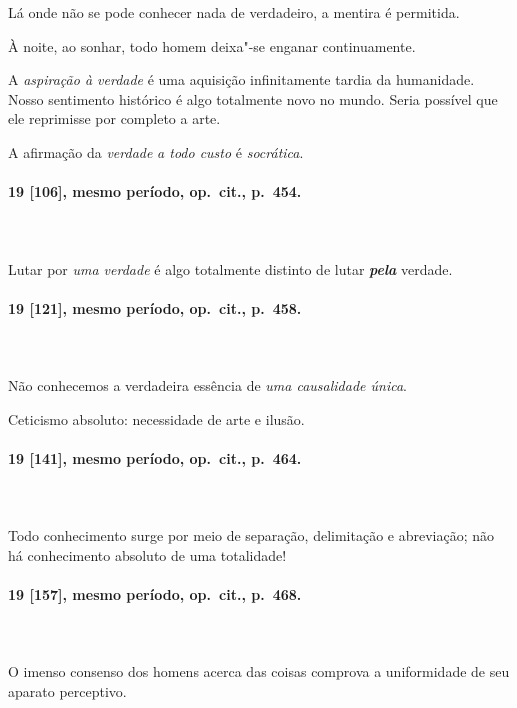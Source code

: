 Lá onde não se pode conhecer nada de verdadeiro, a mentira é permitida.

À noite, ao sonhar, todo homem deixa"-se enganar continuamente.

A \textit{aspiração à verdade} é uma aquisição infinitamente tardia da
humanidade. Nosso sentimento histórico é algo totalmente novo no mundo.
Seria possível que ele reprimisse por completo a arte. 

A afirmação da \textit{verdade} \textit{a todo custo} é
\textit{socrática}.

\pagebreak
\paragraph*{19 [106], mesmo período, op.~cit., p.~454.}
\ \\
\ \\

Lutar por \textit{uma verdade} é algo totalmente distinto de lutar
\textbf{\textit{pela}} verdade.

\pagebreak
\paragraph*{19 [121], mesmo período, op.~cit., p.~458.}
\ \\
\ \\

Não conhecemos a verdadeira essência de \textit{uma causalidade única}.

Ceticismo absoluto: necessidade de arte e ilusão.

\pagebreak
\paragraph*{19 [141], mesmo período, op.~cit., p.~464.}
\ \\
\ \\

Todo conhecimento surge por meio de separação, delimitação e abreviação;
não há conhecimento absoluto de uma totalidade!

\pagebreak
\paragraph*{19 [157], mesmo período, op.~cit., p.~468.}
\ \\
\ \\

O imenso consenso dos homens acerca das coisas comprova a uniformidade
de seu aparato perceptivo.

